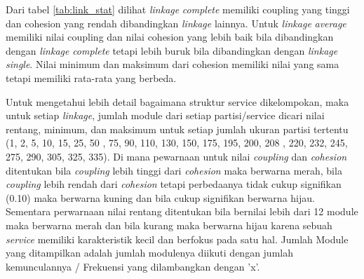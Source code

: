 Dari tabel \ref{tab:link_stat} dilihat \textit{linkage} \textit{complete} memiliki coupling yang tinggi dan cohesion yang rendah dibandingkan \textit{linkage} lainnya. Untuk \textit{linkage} \textit{average} memiliki nilai coupling dan nilai cohesion yang lebih baik  bila dibandingkan dengan \textit{linkage} \textit{complete} tetapi lebih buruk bila dibandingkan dengan \textit{linkage} \textit{single}. Nilai  minimum dan maksimum dari cohesion memiliki nilai yang sama tetapi memiliki rata-rata yang berbeda. 

Untuk mengetahui lebih detail bagaimana struktur service dikelompokan, maka untuk setiap \textit{linkage}, jumlah module dari setiap partisi/service dicari nilai rentang, minimum, dan maksimum untuk setiap jumlah ukuran partisi tertentu (1, 2, 5, 10, 15, 25, 50 , 75, 90, 110, 130, 150, 175, 195, 200, 208 , 220, 232,  245, 275, 290, 305, 325, 335). Di mana pewarnaan untuk nilai \textit{coupling} dan \textit{cohesion} ditentukan bila \textit{coupling} lebih tinggi dari \textit{cohesion} maka berwarna merah, bila \textit{coupling} lebih rendah dari \textit{cohesion} tetapi perbedaanya tidak cukup signifikan (0.10) maka berwarna kuning dan bila cukup signifikan berwarna hijau. Sementara perwarnaan nilai rentang ditentukan bila bernilai lebih dari 12 module maka berwarna merah dan bila kurang maka berwarna hijau karena sebuah \textit{service} memiliki karakteristik kecil dan berfokus pada satu hal.  Jumlah Module yang ditampilkan adalah jumlah modulenya diikuti dengan jumlah kemunculannya / Frekuensi yang dilambangkan dengan 'x'.

